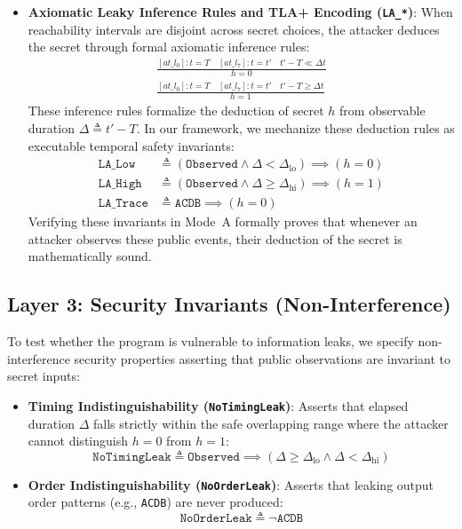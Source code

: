\documentclass[a4paper,12pt]{report}
\begin{document}
\begin{itemize}[itemsep=0.2em, topsep=0.15em]
    \item \textbf{Axiomatic Leaky Inference Rules and TLA+ Encoding (\texttt{LA\_*})}: When reachability intervals are disjoint across secret choices, the attacker deduces the secret through formal axiomatic inference rules:
    \begin{gather}
        \frac{[at\_l_0] : t = T \quad [at\_l_7] : t = t' \quad t' - T \ll \Delta t}{h = 0} \\[1.0ex]
        \frac{[at\_l_0] : t = T \quad [at\_l_7] : t = t' \quad t' - T \ge \Delta t}{h = 1}
    \end{gather}
    These inference rules formalize the deduction of secret $h$ from observable duration $\Delta \triangleq t' - T$. In our framework, we mechanize these deduction rules as executable temporal safety invariants:
    \begin{align*}
        \texttt{LA\_Low}   &\triangleq (\texttt{Observed} \land \Delta < \Delta_{\text{lo}}) \implies (h = 0) \\
        \texttt{LA\_High}  &\triangleq (\texttt{Observed} \land \Delta \ge \Delta_{\text{hi}}) \implies (h = 1) \\
        \texttt{LA\_Trace} &\triangleq \texttt{ACDB} \implies (h = 0)
    \end{align*}
    Verifying these invariants in Mode~A formally proves that whenever an attacker observes these public events, their deduction of the secret is mathematically sound.
\end{itemize}

\subsection{Layer 3: Security Invariants (Non-Interference)}
To test whether the program is vulnerable to information leaks, we specify non-interference security properties asserting that public observations are invariant to secret inputs:
\begin{itemize}[itemsep=0.15em, topsep=0.15em]
    \item \textbf{Timing Indistinguishability (\texttt{NoTimingLeak})}: Asserts that elapsed duration $\Delta$ falls strictly within the safe overlapping range where the attacker cannot distinguish $h = 0$ from $h = 1$:
    \begin{equation}
        \texttt{NoTimingLeak} \triangleq \texttt{Observed} \implies (\Delta \ge \Delta_{\text{lo}} \land \Delta < \Delta_{\text{hi}})
    \end{equation}
    \item \textbf{Order Indistinguishability (\texttt{NoOrderLeak})}: Asserts that leaking output order patterns (e.g., \texttt{ACDB}) are never produced:
    \begin{equation}
        \texttt{NoOrderLeak} \triangleq \neg \texttt{ACDB}
    \end{equation}
\end{itemize}
\end{document}
